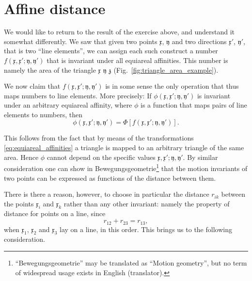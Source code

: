 \documentclass[11pt]{book} \usepackage{amssymb}
\newcommand{\myvec}[1]{\mathfrak{#1}}
\newcommand{\vecx}{\myvec{x}}
\newcommand{\vecy}{\myvec{y}}
\begin{document}
\section{Affine distance}
\label{sec:affine_distance}
We would like to return to the result of the exercise above, and understand it
somewhat differently. We saw that given two points $\vecx$, $\vecy$
and two directions $\vecx'$, $\vecy'$, that is two ``line elements'', 
we can assign each such construct a number 
$f(\vecx,\vecx';\vecy,\vecy')$ that is invariant under all
equiareal affinities. This number is namely the area of the triangle 
$\vecx$ $\vecy$ $\myvec{z}$ (Fig.~\ref{fig:triangle_area_example}).

We now claim that $f(\vecx,\vecx';\vecy,\vecy')$ is in some
sense the only operation that thus maps numbers to line elements. More 
precisely: If $\phi(\vecx,\vecx';\vecy,\vecy')$ is invariant
under an arbitrary equiareal affinity, where $\phi$ is a function that maps
pairs of line elements to numbers, then
$$ \phi(\vecx,\vecx';\vecy,\vecy') = \Phi\left[f(\vecx,\vecx';\vecy,\vecy')\right].$$

This follows from the fact that by means of the transformations 
\eqref{eq:equiareal_affinities} a triangle is mapped to an arbitrary triangle
of the same area. Hence $\phi$ cannot depend on the specific values
$\vecx,\vecx';\vecy,\vecy'$. By similar consideration one can
show in Bewegungsgeometrie\footnote{``Bewegungsgeometrie'' may be 
translated as
``Motion geometry'', but no term of widespread usage exists in English (translator).} 
that the motion invariants of two points can be 
expressed as functions of the distance between them.

There is there a reason, however, to choose in particular the distance $r_{ik}$
between the points $\vecx_i$ and $\vecx_k$ rather than any other
invariant: namely the property of distance for points on a line, since
$$r_{12}+r_{23}=r_{13},$$
when $\vecx_1$,  $\vecx_2$ and $\vecx_3$ lay on a line, in this 
order. This brings us to the following consideration.
 
\end{document}
